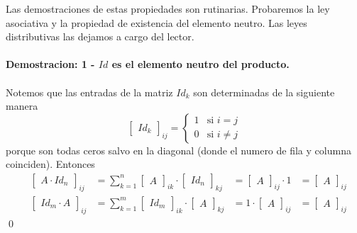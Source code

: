 \documentclass{article}
\theoremstyle{definition}
\theoremstyle{definition}
\theoremstyle{remark}
\begin{document}
Las demostraciones de estas propiedades son rutinarias. Probaremos la ley asociativa y la propiedad de existencia del elemento neutro. Las leyes distributivas las dejamos a cargo del lector.\\\\
\textbf{Demostracion: 1 - $Id$ es el elemento neutro del producto.}\\\\
Notemos que las entradas de la matriz $Id_k$ son determinadas de la siguiente manera \[
  \begin{bmatrix}Id_k\end{bmatrix}_{ij} = \begin{cases} 1 & \text{si } i =j \\
0 & \text{si } i \neq j \end{cases}
\]
porque son todas ceros salvo en la diagonal (donde el numero de fila y columna coinciden). Entonces \[
  \begin{alignedat}{6}
    &\begin{bmatrix}A \cdot Id_n \end{bmatrix}_{ij} & = \sum_{k=1}^n {\begin{bmatrix}A \end{bmatrix}_{ik}\cdot\begin{bmatrix}Id_n\end{bmatrix}_{kj}} &= \begin{bmatrix}A\end{bmatrix}_{ij} \cdot 1 &= \begin{bmatrix}A\end{bmatrix}_{ij} \\
    &\begin{bmatrix}Id_m \cdot A \end{bmatrix}_{ij} &= \sum_{k=1}^m \begin{bmatrix}Id_m \end{bmatrix}_{ik} \cdot \begin{bmatrix}A\end{bmatrix}_{kj} & = 1 \cdot \begin{bmatrix}A\end{bmatrix}_{ij} & = \begin{bmatrix}A\end{bmatrix}_{ij}
  \end{alignedat}
\]\qed
\pagebreak 
\end{document}
